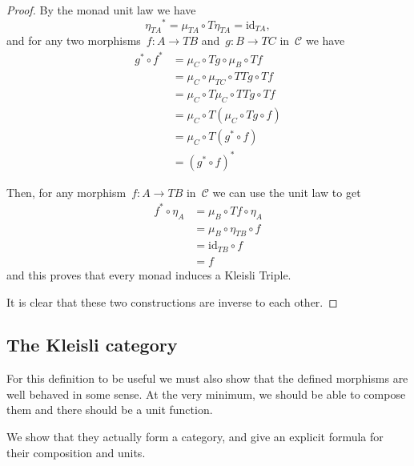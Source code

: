 \documentclass[a4paper]{article}
\theoremstyle{plain}
\theoremstyle{definition}
\newcommand{\id}{\mathrm{id}}
\newcommand{\cat}[1]{\mathcal{#1}}
\begin{document}
\begin{proof}
    By the monad unit law we have
    \[
        {\eta_{TA}}^{\ast} = \mu_{TA} \circ T\eta_{TA} = \id_{TA},
    \]
    and for any two morphisms~\(f:A\longrightarrow TB\)
    and~\(g:B\longrightarrow TC\) in~\(\cat{C}\) we have
    \begin{align*}
        g^{\ast}\circ f^{\ast} &= \mu_{C} \circ Tg \circ \mu_{B} \circ Tf \\
                               &= \mu_{C} \circ \mu_{TC} \circ TTg \circ Tf \\
                               &= \mu_{C} \circ T\mu_{C} \circ TTg \circ Tf \\
                               &= \mu_{C} \circ T(\mu_{C} \circ Tg \circ f) \\
                               &= \mu_{C} \circ T(g^{\ast} \circ f) \\
                               &= (g^{\ast} \circ f)^{\ast}
    \end{align*}

    Then, for any morphism~\(f:A\longrightarrow TB\) in~\(\cat{C}\) we can use
    the unit law to get
    \begin{align*}
        f^{\ast} \circ \eta_{A}
            &= \mu_{B} \circ Tf \circ \eta_{A} \\
            &= \mu_{B} \circ \eta_{TB} \circ f \\
            &= \id_{TB} \circ f \\
            &= f
    \end{align*}
    and this proves that every monad induces a Kleisli Triple.

    It is clear that these two constructions are inverse to each other.
\end{proof}

\subsection{The Kleisli category}
For this definition to be useful we must also show that the defined morphisms
are well behaved in some sense. At the very minimum, we should be able to
compose them and there should be a unit function.

We show that they actually form a category, and give an explicit formula for
their composition and units.
\end{document}
